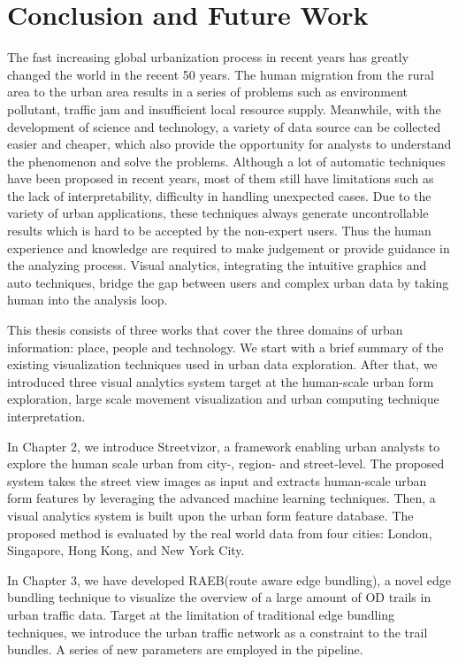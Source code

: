 \chapter{Conclusion and Future Work}

The fast increasing global urbanization process in recent years has greatly changed the world in the recent 50 years. The human migration from the rural area to the urban area results in a series of problems such as environment pollutant, traffic jam and insufficient local resource supply. Meanwhile, with the development of science and technology, a variety of data source can be collected easier and cheaper, which also provide the opportunity for analysts to understand the phenomenon and solve the problems. Although a lot of automatic techniques have been proposed in recent years, most of them still have limitations such as the lack of interpretability, difficulty in handling unexpected cases. Due to the variety of urban applications, these techniques always generate uncontrollable results which is hard to be accepted by the non-expert users. Thus the human experience and knowledge are required to make judgement or provide guidance in the analyzing process. Visual analytics, integrating the intuitive graphics and auto techniques, bridge the gap between users and complex urban data by taking human into the analysis loop.  

This thesis consists of three works that cover the three domains of urban information: place, people and technology. We start with a brief summary of the existing visualization techniques used in urban data exploration. After that, we introduced three visual analytics system target at the human-scale urban form exploration, large scale movement visualization and urban computing technique interpretation.

In Chapter 2, we introduce Streetvizor, a framework enabling urban analysts to explore the human scale urban from city-, region- and street-level. The proposed system takes the street view images as input and extracts human-scale urban form features by leveraging the advanced machine learning techniques. Then, a visual analytics system is built upon the urban form feature database. The proposed method is evaluated by the real world data from four cities: London, Singapore, Hong Kong, and New York City. 

In Chapter 3, we have developed RAEB(route aware edge bundling), a novel edge bundling technique to visualize the overview of a large amount of OD trails in urban traffic data. Target at the limitation of traditional edge bundling techniques, we introduce the urban traffic network as a constraint to the trail bundles. A series of new parameters are employed in the pipeline.

